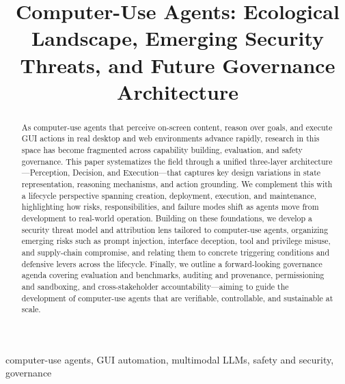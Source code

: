 \documentclass[conference]{IEEEtran}
\begin{document}
\title{Computer-Use Agents: Ecological Landscape, Emerging Security Threats, and Future Governance Architecture\\
}

\author{
\and
{}
\and
{}
}

\maketitle

\begin{abstract}
  As computer-use agents that perceive on-screen content, reason over goals, and execute GUI actions in real desktop and web environments advance rapidly, research in this space has become fragmented across capability building, evaluation, and safety governance. This paper systematizes the field through a unified three-layer architecture—Perception, Decision, and Execution—that captures key design variations in state representation, reasoning mechanisms, and action grounding. We complement this with a lifecycle perspective spanning creation, deployment, execution, and maintenance, highlighting how risks, responsibilities, and failure modes shift as agents move from development to real-world operation. Building on these foundations, we develop a security threat model and attribution lens tailored to computer-use agents, organizing emerging risks such as prompt injection, interface deception, tool and privilege misuse, and supply-chain compromise, and relating them to concrete triggering conditions and defensive levers across the lifecycle. Finally, we outline a forward-looking governance agenda covering evaluation and benchmarks, auditing and provenance, permissioning and sandboxing, and cross-stakeholder accountability—aiming to guide the development of computer-use agents that are verifiable, controllable, and sustainable at scale.
\end{abstract}

\begin{IEEEkeywords}
computer-use agents, GUI automation, multimodal LLMs, safety and security, governance
\end{IEEEkeywords}









\end{document}
